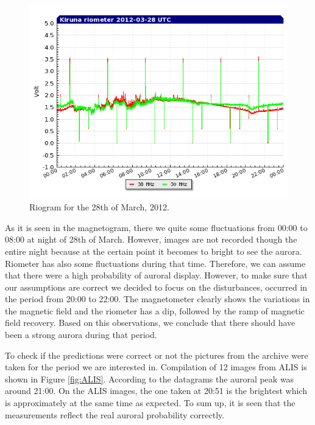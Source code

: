\documentclass{article}
\begin{document}
\begin{figure}[htbp!]
\centering
\centerline{\includegraphics[width=1\textwidth]{Figures/riometer.png}}
\caption{Riogram for the 28th of March, 2012.}
\label{fig:riometer}
\end{figure}

As it is seen in the magnetogram, there we quite some fluctuations from 00:00 to 08:00 at night of 28th of March. However, images are not recorded though the entire night because at the certain point it becomes to bright to see the aurora. Riometer has also some fluctuations during that time. Therefore, we can assume that there were a high probability of auroral display. However, to make sure that our assumptions are correct we decided to focus on the disturbances, occurred in the period from 20:00 to 22:00. The magnetometer clearly shows the variations in the magnetic field and the riometer has a dip, followed by the ramp of magnetic field recovery. Based on this observations, we conclude that there should have been a strong aurora during that period.

To check if the predictions were correct or not the pictures from the archive were taken for the period we are interested in. Compilation of 12 images from ALIS is shown in Figure \ref{fig:ALIS}. According to the datagrams the auroral peak was around 21:00. On the ALIS images, the one taken at 20:51 is the brightest which is approximately at the same time as expected. To sum up, it is seen that the measurements reflect the real auroral probability correctly.
\end{document}
